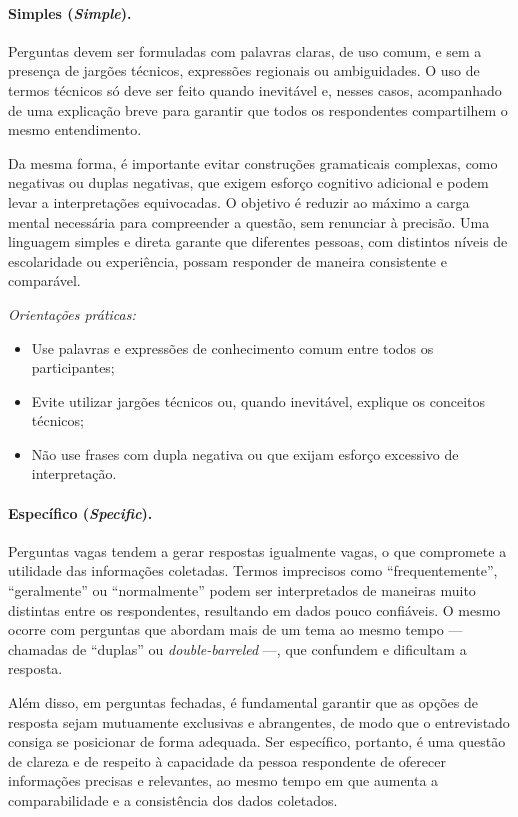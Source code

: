 \documentclass[12pt, a4paper, openany]{book}
\begin{document}
\paragraph{Simples (\textit{Simple}).} Perguntas devem ser formuladas com palavras claras, de uso comum, e sem a presen\c{c}a de jarg\~oes t\'ecnicos, express\~oes regionais ou ambiguidades. O uso de termos t\'ecnicos s\'o deve ser feito quando inevit\'avel e, nesses casos, acompanhado de uma explica\c{c}\~ao breve para garantir que todos os respondentes compartilhem o mesmo entendimento.

Da mesma forma, \'e importante evitar constru\c{c}\~oes gramaticais complexas, como negativas ou duplas negativas, que exigem esfor\c{c}o cognitivo adicional e podem levar a interpreta\c{c}\~oes equivocadas. O objetivo \'e reduzir ao m\'aximo a carga mental necess\'aria para compreender a quest\~ao, sem renunciar \`a precis\~ao. Uma linguagem simples e direta garante que diferentes pessoas, com distintos n\'iveis de escolaridade ou experi\^encia, possam responder de maneira consistente e compar\'avel.

\textit{Orienta\c{c}\~oes pr\'aticas:}
\begin{itemize}
\item Use palavras e express\~oes de conhecimento comum entre todos os participantes;
\item Evite utilizar jarg\~oes t\'ecnicos ou, quando inevit\'avel, explique os conceitos t\'ecnicos;
\item N\~ao use frases com dupla negativa ou que exijam esfor\c{c}o excessivo de interpreta\c{c}\~ao.
\end{itemize}

\paragraph{Espec\'ifico (\textit{Specific}).} Perguntas vagas tendem a gerar respostas igualmente vagas, o que compromete a utilidade das informa\c{c}\~oes coletadas. Termos imprecisos como ``frequentemente'', ``geralmente'' ou ``normalmente'' podem ser interpretados de maneiras muito distintas entre os respondentes, resultando em dados pouco confi\'aveis. O mesmo ocorre com perguntas que abordam mais de um tema ao mesmo tempo --- chamadas de ``duplas'' ou \textit{double-barreled} ---, que confundem e dificultam a resposta.

Al\'em disso, em perguntas fechadas, \'e fundamental garantir que as op\c{c}\~oes de resposta sejam mutuamente exclusivas e abrangentes, de modo que o entrevistado consiga se posicionar de forma adequada. Ser espec\'ifico, portanto, \'e uma quest\~ao de clareza e de respeito \`a capacidade da pessoa respondente de oferecer informa\c{c}\~oes precisas e relevantes, ao mesmo tempo em que aumenta a comparabilidade e a consist\^encia dos dados coletados.
\end{document}
